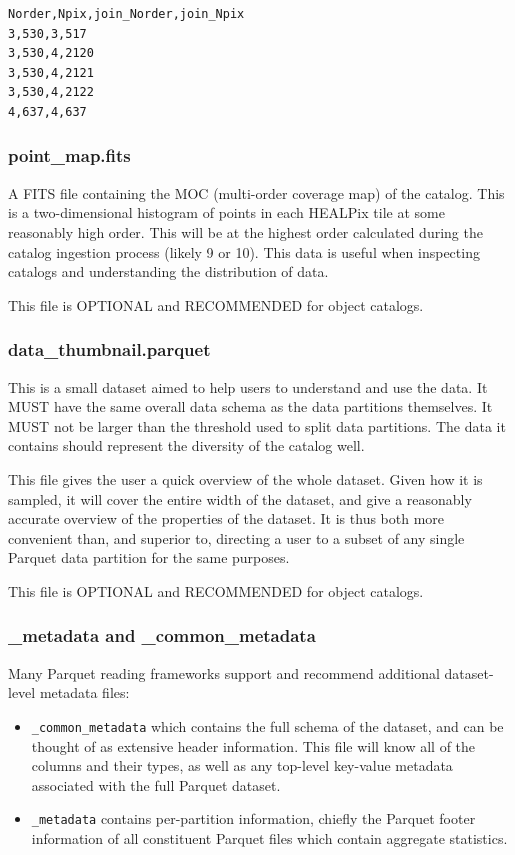 \documentclass[11pt,a4paper]{ivoa}
\begin{document}
\begin{minipage}{\linewidth}
\begin{lstlisting}[caption=Example \texttt{partition\_join\_info.csv} file contents, label=fig:examplePartitionJoinInfoCsv]    
Norder,Npix,join_Norder,join_Npix
3,530,3,517
3,530,4,2120
3,530,4,2121
3,530,4,2122
4,637,4,637
\end{lstlisting}
\end{minipage}

\subsubsection{point\_map.fits} 

A FITS file containing the MOC (multi-order coverage map) of the catalog.
This is a two-dimensional histogram of points in each HEALPix tile at some reasonably high order.
This will be at the highest order calculated during the catalog ingestion process (likely 9 or 10). 
This data is useful when inspecting catalogs and understanding the distribution of data. 

This file is OPTIONAL and RECOMMENDED for object catalogs.

\subsubsection{data\_thumbnail.parquet} 
This is a small dataset aimed to help users to understand and use the data. 
It MUST have the same overall data schema as the data partitions themselves.
It MUST not be larger than the threshold used to split data partitions.
The data it contains should represent the diversity of the catalog well. \par

This file gives the user a quick overview of the whole dataset.
Given how it is sampled, it will cover the entire width of the dataset, and give a reasonably accurate overview of the properties of the dataset. 
It is thus both more convenient than, and superior to, directing a user to a subset of any single Parquet data partition for the same purposes.

This file is OPTIONAL and RECOMMENDED for object catalogs.

\subsubsection{\_metadata and \_common\_metadata} 

Many Parquet reading frameworks support and recommend additional dataset-level metadata files:
\begin{itemize}
    \item \texttt{\_common\_metadata} which contains the full schema of the dataset, and can be thought of as extensive header information. 
    This file will know all of the columns and their types, as well as any top-level key-value metadata associated with the full Parquet dataset.
    \item \texttt{\_metadata} contains per-partition information, chiefly the Parquet footer information of all constituent Parquet files which contain aggregate statistics.
\end{itemize}
\end{document}
